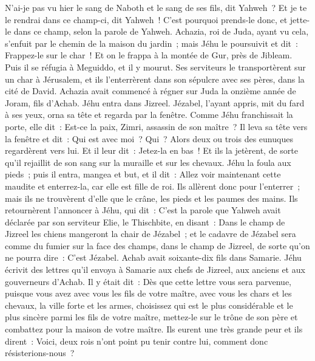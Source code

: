 \begin{multicols}{2}
N'ai-je pas vu hier le sang de Naboth et le sang de ses fils, dit Yahweh~? Et je te le rendrai dans ce champ-ci, dit Yahweh~! C'est pourquoi prends-le donc, et jette-le dans ce champ, selon la parole de Yahweh.
Achazia, roi de Juda, ayant vu cela, s'enfuit par le chemin de la maison du jardin~; mais Jéhu le poursuivit et dit~: Frappez-le sur le char~! Et on le frappa à la montée de Gur, près de Jibleam. Puis il se réfugia à Meguiddo, et il y mourut.
Ses serviteurs le transportèrent sur un char à Jérusalem, et ils l'enterrèrent dans son sépulcre avec ses pères, dans la cité de David.
Achazia avait commencé à régner sur Juda la onzième année de Joram, fils d'Achab.
Jéhu entra dans Jizreel. Jézabel, l'ayant appris, mit du fard à ses yeux, orna sa tête et regarda par la fenêtre.
Comme Jéhu franchissait la porte, elle dit~: Est-ce la paix, Zimri, assassin de son maître~?
Il leva sa tête vers la fenêtre et dit~: Qui est avec moi~? Qui~? Alors deux ou trois des eunuques regardèrent vers lui.
Et il leur dit~: Jetez-la en bas~! Et ils la jetèrent, de sorte qu'il rejaillit de son sang sur la muraille et sur les chevaux. Jéhu la foula aux pieds~;
puis il entra, mangea et but, et il dit~: Allez voir maintenant cette maudite et enterrez-la, car elle est fille de roi.
Ils allèrent donc pour l'enterrer~; mais ils ne trouvèrent d'elle que le crâne, les pieds et les paumes des mains.
Ils retournèrent l'annoncer à Jéhu, qui dit~: C'est la parole que Yahweh avait déclarée par son serviteur Elie, le Thischbite, en disant~: Dans le champ de Jizreel les chiens mangeront la chair de Jézabel~;
et le cadavre de Jézabel sera comme du fumier sur la face des champs, dans le champ de Jizreel, de sorte qu'on ne pourra dire~: C'est Jézabel.
\VerseOne{}Achab avait soixante-dix fils dans Samarie. Jéhu écrivit des lettres qu'il envoya à Samarie aux chefs de Jizreel, aux anciens et aux gouverneurs d'Achab. Il y était dit~:
Dès que cette lettre vous sera parvenue, puisque vous avez avec vous les fils de votre maître, avec vous les chars et les chevaux, la ville forte et les armes,
choisissez qui est le plus considérable et le plus sincère parmi les fils de votre maître, mettez-le sur le trône de son père et combattez pour la maison de votre maître.
Ils eurent une très grande peur et ils dirent~: Voici, deux rois n'ont point pu tenir contre lui, comment donc résisterions-nous~?

\end{multicols}

